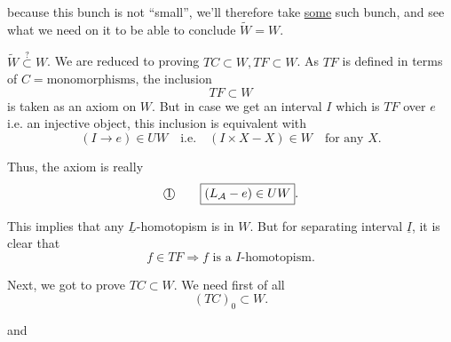 
because this bunch is not ``small'', we'll therefore take \uline{some} such bunch, and see what we need on it to be able to conclude $\widetilde W=W$.

$\widetilde W\overset{?}{\subset}W$. We are reduced to proving $TC\subset W,TF\subset W$. As $TF$ is defined in terms of $C=\text{monomorphisms}$, the inclusion
\[
\boxed{TF\subset W}
\]
is taken as an axiom on $W$. But in case we get an  interval $I$ which is $TF$ over $e$ i.e. an injective object,  this inclusion is equivalent with
\[
\boxed{(I\longrightarrow e)\in UW\quad\text{i.e.}\quad(I\times X-X)\in W\quad\text{for any }X}.
\]

Thus, the axiom is really
\[
\text{\textcircled{1}}\qquad\boxed{(L_{\mathcal A}-e)\in UW}.
\]

This implies that any $\underline L$-homotopism is in $W$.
But for  separating interval $\underline I$, it is clear that
\[
f\in TF\Longrightarrow f\text{ is a }I\text{-homotopism}.
\]

Next, we got to prove $TC\subset W$. We need first of all
\[
(TC)_0\subset W.
\]

and

